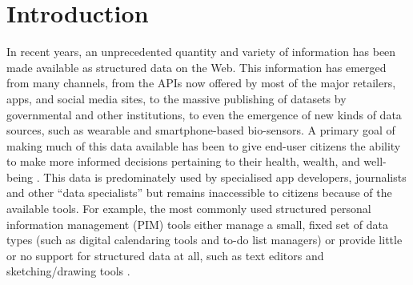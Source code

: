 \documentclass{sigchi}
\begin{document}
\begin{abstract}

\end{abstract}




\section{Introduction}

In recent years, an unprecedented quantity and variety of information has been made available as structured data on the Web.  This information has emerged from many channels, from the APIs now offered by most of the major retailers, apps, and social media sites, to the massive publishing of datasets by governmental and other institutions, to even the emergence of new kinds of data sources, such as wearable and smartphone-based bio-sensors.  A primary goal of making much of this data available has been to give end-user citizens the ability to make more informed decisions pertaining to their health, wealth, and well-being \cite{Shadbolt:2006:SWR:1155313.1155373}.  This data is predominately used by specialised app developers, journalists and other ``data specialists'' but remains inaccessible to citizens because of the available tools.  For example, the most commonly used structured personal information management (PIM) tools either manage a small, fixed set of data types (such as digital calendaring tools and  to-do list managers) or provide little or no support for structured data at all, such as text editors and sketching/drawing tools \cite{infoscraps}.   
\end{document}
